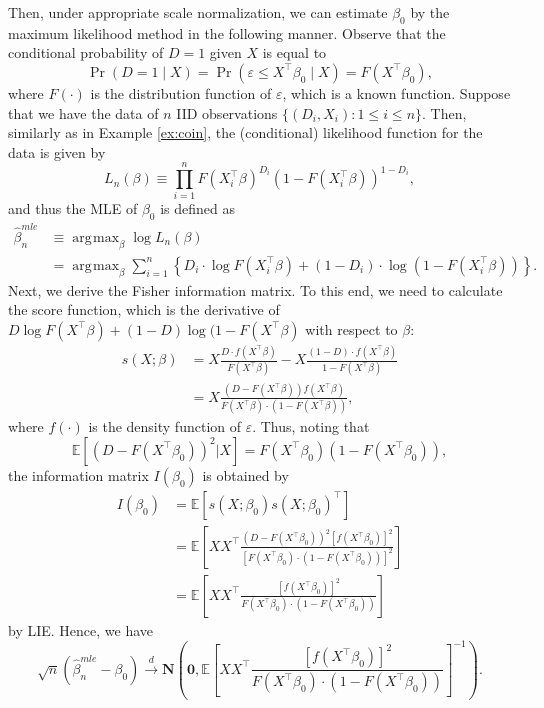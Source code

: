 \documentclass[10.5pt, A4paper, openany, uplatex]{book}
\newcommand{\mbf}{\mathbf}
\newcommand{\eps}{\varepsilon}
\newcommand{\E}{\mathbb{E}}
\renewcommand{\hat}{\widehat}
\numberwithin{equation}{section}
\DeclareMathOperator*{\argmax}{\arg\!\max}
\begin{document}
Then, under appropriate scale normalization, we can estimate $\beta_0$ by the maximum likelihood method in the following manner.
Observe that the conditional probability of $D = 1$ given $X$ is equal to
\[
	\Pr(D = 1 \mid X) = \Pr( \eps \le X^\top\beta_0 \mid X) = F(X^\top\beta_0),
\]
where $F(\cdot)$ is the distribution function of $\eps$, which is a known function.
Suppose that we have the data of $n$ IID observations $\{(D_i, X_i): 1 \le i \le n\}$.
Then, similarly as in Example \ref{ex:coin}, the (conditional) likelihood function for the data is given by
\[
	L_n(\beta) \equiv \prod_{i=1}^n F(X_i^\top\beta)^{D_i} (1 -  F(X_i^\top\beta))^{1 - D_i},
\] 
and thus the MLE of $\beta_0$ is defined as
\begin{align*}
	\hat \beta_n^{mle} 
	& \equiv \argmax_\beta \log L_n(\beta) \\
	& = \argmax_\beta \sum_{i =1}^n\left\{ D_i \cdot \log F(X_i^\top \beta) + (1 - D_i) \cdot \log(1 -  F(X_i^\top\beta)) \right\}.
\end{align*}
Next, we derive the Fisher information matrix.
To this end, we need to calculate the score function, which is the derivative of  $D \log F(X^\top \beta) + (1 - D) \log(1 -  F(X^\top\beta)$ with respect to $\beta$:
\begin{align*}
	s(X; \beta) 
	& = X \frac{D \cdot f(X^\top \beta)}{F(X^\top \beta)} - X \frac{(1 - D) \cdot f(X^\top \beta)}{1 - F(X^\top \beta)}\\
	& = X \frac{(D - F(X^\top \beta))f(X^\top \beta)}{F(X^\top \beta) \cdot (1 -  F(X^\top\beta)) },
\end{align*}
where $f(\cdot)$ is the density function of $\eps$.
Thus, noting that 
\[
	\E[(D - F(X^\top\beta_0))^2|X] = F(X^\top \beta_0) (1 - F(X^\top \beta_0)),
\]
the information matrix $I(\beta_0)$ is obtained by
\begin{align*}
	I(\beta_0)
	& = \E\left[ s(X; \beta_0) s(X; \beta_0)^\top \right] \\ 
	& = \E\left[ XX^\top  \frac{(D - F(X^\top \beta_0))^2 [f(X^\top \beta_0)]^2}{[F(X^\top \beta_0) \cdot (1 -  F(X^\top\beta_0))]^2 }\right] \\
	& = \E\left[ XX^\top  \frac{[f(X^\top \beta_0)]^2}{F(X^\top \beta_0) \cdot (1 -  F(X^\top\beta_0)) }\right] 
\end{align*}
by LIE.
Hence, we have
\[
	\sqrt{n}(\hat \beta_n^{mle} - \beta_0) \overset{d}{\to} \mbf{N}\left( \mbf{0}, \E\left[ XX^\top  \frac{[f(X^\top \beta_0)]^2}{F(X^\top \beta_0) \cdot (1 -  F(X^\top\beta_0)) }\right]^{-1}  \right).
\]
\end{document}
